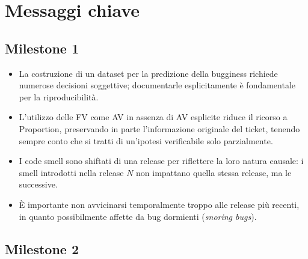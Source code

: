 \section{Messaggi chiave}

\subsection{Milestone 1}

\begin{itemize}
    \item La costruzione di un dataset per la predizione della bugginess richiede numerose
    decisioni soggettive; documentarle esplicitamente è fondamentale per la riproducibilità.

    \item L'utilizzo delle FV come AV in assenza di AV esplicite riduce il ricorso a
    Proportion, preservando in parte l'informazione originale del ticket, tenendo sempre
    conto che si tratti di un'ipotesi verificabile solo parzialmente.

    \item I code smell sono shiftati di una release per riflettere la loro natura causale:
    i smell introdotti nella release $N$ non impattano quella stessa release, ma le successive.

    \item È importante non avvicinarsi temporalmente troppo alle release più recenti, in
    quanto possibilmente affette da bug dormienti (\textit{snoring bugs}).
\end{itemize}

\subsection{Milestone 2}

